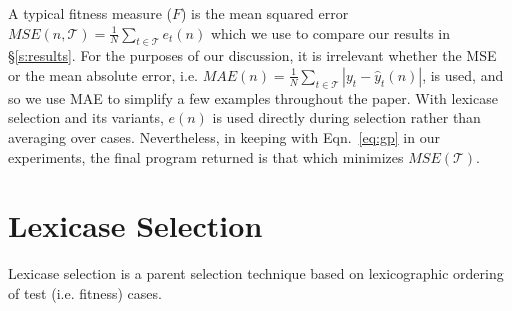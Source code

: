 \documentclass[twoside]{article}
\begin{document}
A typical fitness measure ($F$) is the mean squared error $MSE(n,\mathcal{T}) = \frac{1}{N} \sum_{t \in \mathcal{T}}{e_t(n)}$ which we use to compare our results in \S\ref{s:results}. For the purposes of our discussion, it is irrelevant whether the MSE or the mean absolute error, i.e. $MAE(n) = \frac{1}{N} \sum_{t \in \mathcal{T}}{|y_t - \hat{y}_t(n)|}$, is used, and so we use MAE to simplify a few examples throughout the paper. With lexicase selection and its variants, $e(n)$ is used directly during selection rather than averaging over cases. Nevertheless, in keeping with Eqn.~\ref{eq:gp} in our experiments, the final program returned is that which minimizes $MSE(\mathcal{T})$.

%

\section{Lexicase Selection}\label{s:lex}
Lexicase selection is a parent selection technique based on lexicographic ordering of test (i.e. fitness) cases.   

\end{document}
